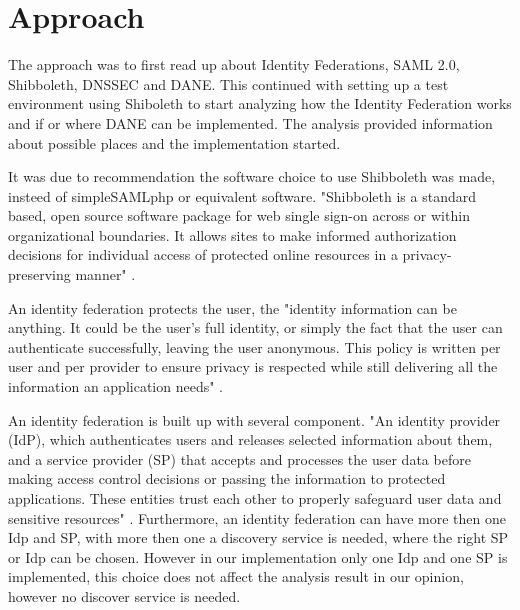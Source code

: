 \section{Approach}

The approach was to first read up about Identity Federations, SAML 2.0, Shibboleth, DNSSEC and DANE. 
This continued with setting up a test environment using Shiboleth to start analyzing how the Identity Federation works and if or where DANE can be implemented. 
The analysis provided information about possible places and the implementation started.  

It was due to recommendation the software choice to use Shibboleth was made, insteed of simpleSAMLphp or equivalent software. 
"Shibboleth is a standard based, open source software package for web single sign-on across or within organizational boundaries. 
It allows sites to make informed authorization decisions for individual access of protected online resources in a privacy-preserving manner" \cite{website:Shibboleth}.

An identity federation protects the user, the "identity information can be anything. 
It could be the user's full identity, or simply the fact that the user can authenticate successfully, leaving the user anonymous. 
This policy is written per user and per provider to ensure privacy is respected while still delivering all the information an application needs" \cite{website:ShibbolethHighLevelIntro}.

An identity federation is built up with several component. 
"An identity provider (IdP), which authenticates users and releases selected information about them, and a service provider (SP) that accepts and processes the user data before making access control decisions or passing the information to protected applications. 
These entities trust each other to properly safeguard user data and sensitive resources" \cite{website:Shibboleth}. 
Furthermore,  an identity federation can have more then one Idp and SP, with more then one a discovery service is needed, where the right SP or Idp can be chosen.
However in our implementation only one Idp and one SP is implemented, this choice does not affect the analysis result in our opinion, however no discover service is needed. 




